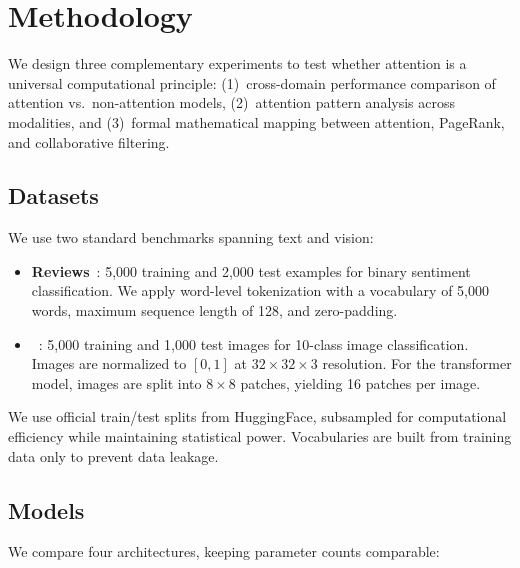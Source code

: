 \section{Methodology}
\label{sec:method}

We design three complementary experiments to test whether attention is a universal computational principle: (1)~cross-domain performance comparison of attention vs.\ non-attention models, (2)~attention pattern analysis across modalities, and (3)~formal mathematical mapping between attention, PageRank, and collaborative filtering.

\subsection{Datasets}
\label{sec:datasets}

We use two standard benchmarks spanning text and vision:

\begin{itemize}[leftmargin=*,itemsep=2pt,topsep=2pt]
    \item \textbf{\imdb Reviews}~\citep{maas2011learning}: 5{,}000 training and 2{,}000 test examples for binary sentiment classification. We apply word-level tokenization with a vocabulary of 5{,}000 words, maximum sequence length of 128, and zero-padding.
    \item \textbf{\cifarten}~\citep{krizhevsky2009learning}: 5{,}000 training and 1{,}000 test images for 10-class image classification. Images are normalized to $[0,1]$ at $32 {\times} 32 {\times} 3$ resolution. For the transformer model, images are split into $8 {\times} 8$ patches, yielding 16 patches per image.
\end{itemize}

We use official train/test splits from HuggingFace, subsampled for computational efficiency while maintaining statistical power. Vocabularies are built from training data only to prevent data leakage.

\subsection{Models}
\label{sec:models}

We compare four architectures, keeping parameter counts comparable:

